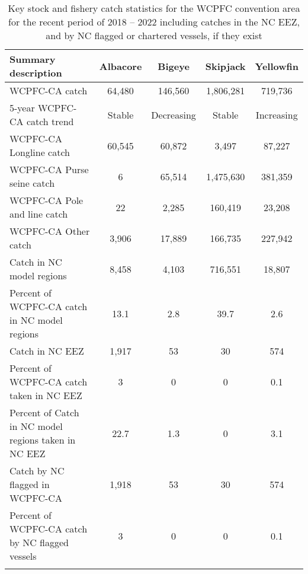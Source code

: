 \begin{longtable}{lcccc}
\caption{Key stock and fishery catch statistics for the WCPFC convention area for the recent period of 2018 -- 2022 including catches in the NC EEZ, and by NC flagged or chartered vessels, if they exist} \\ 
  \hline
Summary description & Albacore & Bigeye & Skipjack & Yellowfin \\ 
  \hline
WCPFC-CA catch & 64,480 & 146,560 & 1,806,281 & 719,736 \\ 
  5-year WCPFC-CA catch trend & Stable & Decreasing & Stable & Increasing \\ 
  WCPFC-CA Longline catch & 60,545 & 60,872 & 3,497 & 87,227 \\ 
  WCPFC-CA Purse seine catch & 6 & 65,514 & 1,475,630 & 381,359 \\ 
  WCPFC-CA Pole and line catch & 22 & 2,285 & 160,419 & 23,208 \\ 
  WCPFC-CA Other catch & 3,906 & 17,889 & 166,735 & 227,942 \\ 
  Catch in NC model regions & 8,458 & 4,103 & 716,551 & 18,807 \\ 
  Percent of WCPFC-CA catch in NC model regions & 13.1 & 2.8 & 39.7 & 2.6 \\ 
   \hline
Catch in NC EEZ & 1,917 & 53 & 30 & 574 \\ 
  Percent of WCPFC-CA catch taken in NC EEZ & 3 & 0 & 0 & 0.1 \\ 
  Percent of Catch in NC model regions taken in NC EEZ & 22.7 & 1.3 & 0 & 3.1 \\ 
  Catch by NC flagged in WCPFC-CA & 1,918 & 53 & 30 & 574 \\ 
  Percent of WCPFC-CA catch by NC flagged vessels & 3 & 0 & 0 & 0.1 \\ 
  \hline
\label{cat_sum_tab}
\end{longtable}
